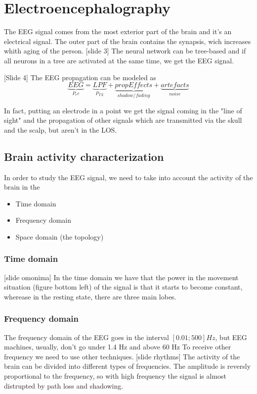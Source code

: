 \chapter{Electroencephalography}
The EEG signal comes from the most exterior part of the brain and it's an electrical signal. The outer part of the brain contains the synapsis, wich increases whith aging of the person.
[slide 3]
The neural network can be tree-based and if all neurons in a tree are activated at the same time, we get the EEG signal.

[Slide 4]
The EEG propagation can be modeled as
\begin{equation}
  \underbrace{EEG}_{P_rc}= \underbrace{LPF}_{P_{TX}} + \underbrace{propEffects}_{shadow/fading} + \underbrace{artefacts}_{noise}
\end{equation}

In fact, putting an electrode in a point we get the signal coming in the "line of sight" and the propagation of other signals which are transmitted via the skull and the scalp, but aren't in the LOS.

\section{Brain activity characterization}\label{sec:bac}
In order to study the EEG signal, we need to take into account the activity of the brain in the \begin{itemize}
  \item Time domain
  \item Frequency domain
  \item Space domain (the topology)
\end{itemize}
\subsection{Time domain}
[slide omonima]
In the time domain we have that the power in the movement situation (figure bottom left) of the signal is that it starts to become constant, wherease in the resting state, there are three main lobes.

\subsection{Frequency domain}
The frequency domain of the EEG goes in the interval $[0.01;500] Hz$, but EEG machines, usually, don't go under 1.4 Hz and above 60 Hz
To receive other frequency we need to use other techniques.
[slide rhythms]
The activity of the brain can be divided into different types of frequencies. The amplitude is reversly proportional to the frequency, so with high frequency the signal is almost distrupted by path loss and shadowing.

